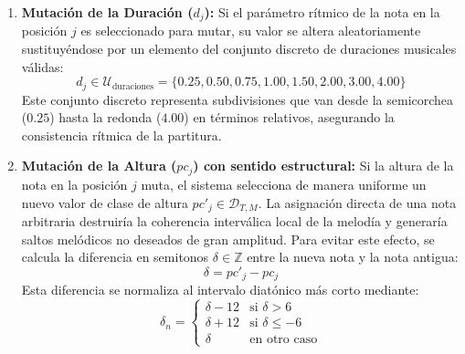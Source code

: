 \begin{enumerate}
    \item \textbf{Mutación de la Duración ($d_j$):} Si el parámetro rítmico de la nota en la posición $j$ es seleccionado para mutar, su valor se altera aleatoriamente sustituyéndose por un elemento del conjunto discreto de duraciones musicales válidas:
    \begin{equation}
        d_j \in \mathcal{U}_{\text{duraciones}} = \{0.25, 0.50, 0.75, 1.00, 1.50, 2.00, 3.00, 4.00\}
    \end{equation}
    Este conjunto discreto representa subdivisiones que van desde la semicorchea ($0.25$) hasta la redonda ($4.00$) en términos relativos, asegurando la consistencia rítmica de la partitura.
    
    \item \textbf{Mutación de la Altura ($pc_j$) con sentido estructural:} Si la altura de la nota en la posición $j$ muta, el sistema selecciona de manera uniforme un nuevo valor de clase de altura $pc'_j \in \mathcal{D}_{T,M}$. La asignación directa de una nota arbitraria destruiría la coherencia interválica local de la melodía y generaría saltos melódicos no deseados de gran amplitud. Para evitar este efecto, se calcula la diferencia en semitonos $\delta \in \mathbb{Z}$ entre la nueva nota y la nota antigua:
    \begin{equation}
        \delta = pc'_j - pc_j
    \end{equation}
    Esta diferencia se normaliza al intervalo diatónico más corto mediante:
    \begin{equation}
        \delta_n = \begin{cases} \delta - 12 & \text{si } \delta > 6 \\ \delta + 12 & \text{si } \delta \le -6 \\ \delta & \text{en otro caso} \end{cases}
    \end{equation}
    

\end{enumerate}
